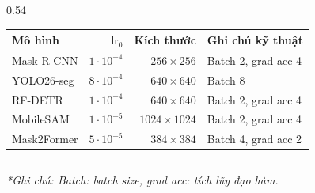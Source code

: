 \begin{frame}
\begin{columns}[T]
\begin{column}{0.54\textwidth}
\begin{table}[h]
\begin{tabular}{lrrp{2.6cm}}
                    Mô hình     & $\text{lr}_0$     & Kích thước         & Ghi chú kỹ thuật    \\
                    \midrule
                    Mask R-CNN  & $1 \cdot 10^{-4}$ & $256 \times 256$   & Batch 2, grad acc 4 \\
                    YOLO26-seg  & $8 \cdot 10^{-4}$ & $640 \times 640$   & Batch 8             \\
                    RF-DETR     & $1 \cdot 10^{-4}$ & $640 \times 640$   & Batch 2, grad acc 4 \\
                    MobileSAM   & $1 \cdot 10^{-5}$ & $1024 \times 1024$ & Batch 2, grad acc 4 \\
                    Mask2Former & $5 \cdot 10^{-5}$ & $384 \times 384$   & Batch 4, grad acc 2 \\
                    \bottomrule
                \end{tabular}
            \end{table}
        \end{column}
    \end{columns}
    \vspace{0.1cm}
    \scriptsize
    \textit{*Ghi chú: Batch: batch size, grad acc: tích lũy đạo hàm.}
\end{frame}


